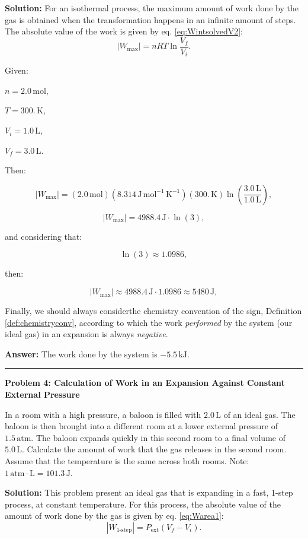 \documentclass[
  9pt,
]{extbook}
\theoremstyle{definition}
\theoremstyle{definition}
\theoremstyle{definition}
\theoremstyle{definition}
\theoremstyle{remark}
\begin{document}
\textbf{Solution:} For an isothermal process, the maximum amount of work done by the gas is obtained when the transformation happens in an infinite amount of steps. The absolute value of the work is given by eq. \eqref{eq:WintsolvedV2}: \[  \left| W_{\text{max}} \right| = nRT \ln \frac{V_f}{V_i}.\]

Given:

\(n=2.0\,\text{mol}\),

\(T=300.\,\text{K}\),

\(V_i=1.0\,\text{L}\),

\(V_f=3.0\,\text{L}\).

Then:

\[\left| W_{\text{max}} \right|=(2.0\,\text{mol})(8.314\,\text{J} \, \text{mol}^{-1} \, \text{K}^{-1})(300.\,\text{K})\ln\left(\frac{3.0\,\text{L}}{1.0\,\text{L}}\right),\]

\[\left| W_{\text{max}} \right|=4988.4\,\text{J}\cdot \ln(3),\]

and considering that:

\[\ln(3)\approx 1.0986,\]

then:

\[\left| W_{\text{max}} \right|\approx 4988.4\,\text{J} \cdot 1.0986 \approx 5480\,\text{J},\]

Finally, we should always considerthe chemistry convention of the sign, Definition \ref{def:chemistryconv}, according to which the work \emph{performed} by the system (our ideal gas) in an expansion is always \emph{negative}.

\textbf{Answer:} The work done by the system is \(-5.5\,\text{kJ}\).

\begin{center}\rule{0.5\linewidth}{0.5pt}\end{center}

\textbf{Problem 4: Calculation of Work in an Expansion Against Constant External Pressure}

In a room with a high pressure, a baloon is filled with \(2.0\,\text{L}\) of an ideal gas. The baloon is then brought into a different room at a lower external pressure of \(1.5\,\text{atm}\). The baloon expands quickly in this second room to a final volume of \(5.0\,\text{L}\). Calculate the amount of work that the gas releases in the second room. Assume that the temperature is the same across both rooms. Note: \(1 \,\text{atm}\cdotp\text{L} = 101.3\,\text{J}\).

\textbf{Solution:} This problem present an ideal gas that is expanding in a fast, 1-step process, at constant temperature. For this process, the absolute value of the amount of work done by the gas is given by eq. \eqref{eq:Warea1}: \[  \left| W_{\text{1-step}} \right| = P_{\text{ext}} (V_f-V_i).\]
\end{document}
